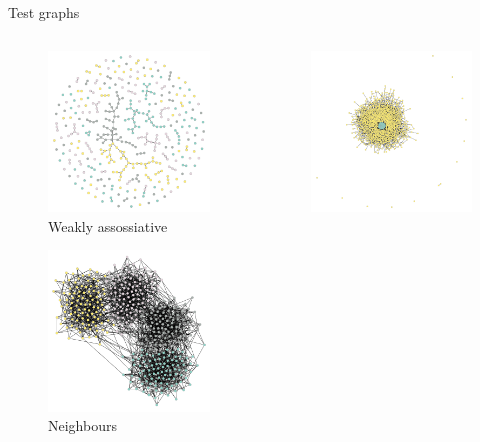 \documentclass[11pt]{beamer}
\begin{document}
\begin{frame}{Test graphs}
\vspace{-1em}
\begin{columns}
	\begin{column}{.5\textwidth}
		\begin{figure}[ht]
			\centering
			\includegraphics[width=.5\textwidth]{blockmodel0}
			\caption{Weakly assossiative}
		\end{figure}
		\vspace{-2em}
		\begin{figure}[ht]
			\centering
			\includegraphics[width=.5\textwidth]{blockmodel1}
			\caption{Neighbours}
		\end{figure}
	\end{column}
	\begin{column}{.5\textwidth}
		\begin{figure}[ht]
			\centering
			\includegraphics[width=.5\textwidth]{blockmodel2}

\end{figure}
\end{column}
\end{columns}
\end{frame}
\end{document}
